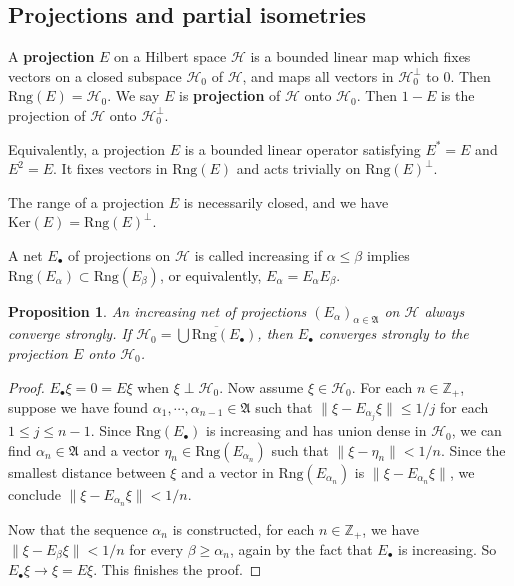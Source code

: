 \documentclass[12pt,a4paper,notitlepage]{article}
\theoremstyle{definition}
\theoremstyle{plain}
\newtheorem{pp}[df]{Proposition}
\newcommand{\fk}{\mathfrak}
\newcommand{\mc}{\mathcal}
\newcommand{\ovl}{\overline}
\newcommand{\blt}{\bullet}
\newcommand{\Zbb}{\mathbb Z}
\newcommand{\Ker}{\mathrm{Ker}}
\newcommand{\Rng}{\mathrm{Rng}}
\numberwithin{equation}{section}
\begin{document}
\subsection*{Projections and partial isometries}


A \textbf{projection} $E$ on a Hilbert space $\mc H$ is a bounded linear map which fixes vectors on a closed subspace $\mc H_0$ of $\mc H$, and maps all vectors in $\mc H_0^\perp$ to $0$. Then $\Rng(E)=\mc H_0$. We say $E$ is \textbf{projection} of $\mc H$ onto $\mc H_0$. Then $1-E$ is the projection of $\mc H$ onto $\mc H_0^\perp$. 

Equivalently, a projection $E$ is a bounded linear operator satisfying $E^*=E$ and $E^2=E$. It fixes vectors in $\Rng(E)$ and acts trivially on $\Rng(E)^\perp$.

 



The range of a projection $E$ is necessarily closed, and we have $\Ker(E)=\Rng(E)^\perp$. 

A net $E_\blt$ of projections on $\mc H$ is called increasing if $\alpha\leq\beta$ implies $\Rng(E_\alpha)\subset\Rng(E_\beta)$, or equivalently, $E_\alpha=E_\alpha E_\beta$.

\begin{pp}
An increasing net of projections $(E_\alpha)_{\alpha\in\fk A}$ on $\mc H$ always converge strongly. If $\mc H_0=\ovl{\bigcup \Rng(E_\blt)}$, then $E_\blt$ converges strongly to the projection $E$ onto $\mc H_0$.
\end{pp}

\begin{proof}
$E_\blt\xi=0=E\xi$ when $\xi\perp\mc H_0$. Now assume $\xi\in\mc H_0$. For each $n\in\Zbb_+$, suppose we have found $\alpha_1,\cdots,\alpha_{n-1}\in\fk A$  such that $\lVert \xi-E_{\alpha_j}\xi\lVert \leq 1/j$ for each $1\leq j\leq n-1$. Since $\Rng(E_\blt)$ is increasing and has union dense in $\mc H_0$, we can find $\alpha_n\in\fk A$ and a vector $\eta_n\in\Rng(E_{\alpha_n})$ such that $\lVert\xi-\eta_n\lVert<1/n$. Since the smallest distance between $\xi$ and a vector in $\Rng(E_{\alpha_n})$ is $\lVert\xi-E_{\alpha_n}\xi\lVert$, we conclude $\lVert\xi-E_{\alpha_n}\xi\lVert<1/n$.

Now that the sequence $\alpha_n$ is constructed, for each $n\in\Zbb_+$, we have $\lVert\xi-E_\beta\xi\lVert<1/n$ for every $\beta\geq\alpha_n$, again by the fact that $E_\blt$ is increasing. So $E_\blt\xi\rightarrow \xi=E\xi$. This finishes the proof.
\end{proof}
\end{document}
